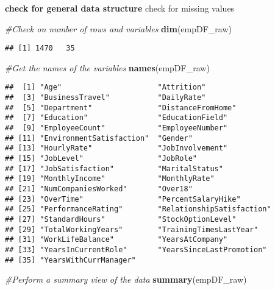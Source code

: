 \documentclass[]{article}
\newenvironment{Shaded}{\begin{snugshade}}{\end{snugshade}}
\newcommand{\KeywordTok}[1]{\textcolor[rgb]{0.13,0.29,0.53}{\textbf{#1}}}
\newcommand{\CommentTok}[1]{\textcolor[rgb]{0.56,0.35,0.01}{\textit{#1}}}
\newcommand{\NormalTok}[1]{#1}
\begin{document}
\textbf{check for general data structure }check for missing values

\begin{Shaded}
\begin{Highlighting}[]
\CommentTok{#Check on number of rows and variables}
\KeywordTok{dim}\NormalTok{(empDF_raw)}
\end{Highlighting}
\end{Shaded}

\begin{verbatim}
## [1] 1470   35
\end{verbatim}

\begin{Shaded}
\begin{Highlighting}[]
\CommentTok{#Get the names of the variables}
\KeywordTok{names}\NormalTok{(empDF_raw)}
\end{Highlighting}
\end{Shaded}

\begin{verbatim}
##  [1] "Age"                      "Attrition"               
##  [3] "BusinessTravel"           "DailyRate"               
##  [5] "Department"               "DistanceFromHome"        
##  [7] "Education"                "EducationField"          
##  [9] "EmployeeCount"            "EmployeeNumber"          
## [11] "EnvironmentSatisfaction"  "Gender"                  
## [13] "HourlyRate"               "JobInvolvement"          
## [15] "JobLevel"                 "JobRole"                 
## [17] "JobSatisfaction"          "MaritalStatus"           
## [19] "MonthlyIncome"            "MonthlyRate"             
## [21] "NumCompaniesWorked"       "Over18"                  
## [23] "OverTime"                 "PercentSalaryHike"       
## [25] "PerformanceRating"        "RelationshipSatisfaction"
## [27] "StandardHours"            "StockOptionLevel"        
## [29] "TotalWorkingYears"        "TrainingTimesLastYear"   
## [31] "WorkLifeBalance"          "YearsAtCompany"          
## [33] "YearsInCurrentRole"       "YearsSinceLastPromotion" 
## [35] "YearsWithCurrManager"
\end{verbatim}

\begin{Shaded}
\begin{Highlighting}[]
\CommentTok{#Perform a summary view of the data}
\KeywordTok{summary}\NormalTok{(empDF_raw)}
\end{Highlighting}
\end{Shaded}
\end{document}
